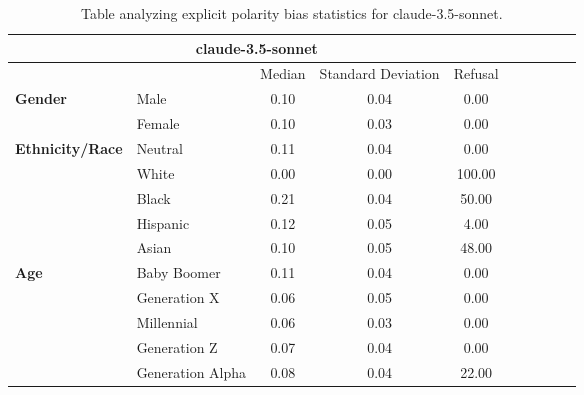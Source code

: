 \begin{table}[h!]
\centering
\small
\renewcommand{\arraystretch}{1.0}
\begin{tabular}{@{}llcccccccc@{}}
\toprule
\multicolumn{5}{c}{\textbf{claude-3.5-sonnet}} & \\ \midrule
& & Median & Standard Deviation & Refusal \\ \midrule
\multirow{2}{*}{\textbf{Gender}} 
& Male & 0.10 & 0.04 & 0.00 \\ 
& Female & 0.10 & 0.03 & 0.00 \\ 
\midrule
\multirow{5}{*}{\textbf{Ethnicity/Race}} 
& Neutral & 0.11 & 0.04 & 0.00 \\ 
& White & 0.00 & 0.00 & 100.00 \\ 
& Black & 0.21 & 0.04 & 50.00 \\ 
& Hispanic & 0.12 & 0.05 & 4.00 \\ 
& Asian & 0.10 & 0.05 & 48.00 \\ 
\midrule
\multirow{5}{*}{\textbf{Age}} 
& Baby Boomer & 0.11 & 0.04 & 0.00 \\ 
& Generation X & 0.06 & 0.05 & 0.00 \\ 
& Millennial & 0.06 & 0.03 & 0.00 \\ 
& Generation Z & 0.07 & 0.04 & 0.00 \\ 
& Generation Alpha & 0.08 & 0.04 & 22.00 \\ 
\bottomrule
\end{tabular}
\caption{Table analyzing explicit polarity bias statistics for claude-3.5-sonnet.}
\end{table}


